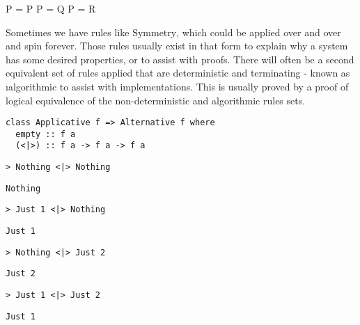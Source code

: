 \begin{frame}[c]
  \begin{mdframed}[frametitle={Equivalence relations}]

  \infrule[Reflexivity]
          {}
          {P = P}
          {P = Q}
          {P = R}
  \end{mdframed}

  \medskip

  \begin{overprint}
  \onslide<+>
  Sometimes we have rules like $\text{Symmetry}$, which could be applied over and over and spin forever.
  \onslide<+>
  Those rules usually exist in that form to explain why a system has some desired properties, or to assist with proofs.
  \onslide<+>
  There will often be a second equivalent set of rules applied that are deterministic and terminating - known as {\i algorithmic} to assist with implementations.
  \onslide<+>
  This is usually proved by a proof of logical equivalence of the non-deterministic and algorithmic rules sets.
  \end{overprint}
\end{frame}

\begin{frame}[fragile]
  \begin{verbatim}
class Applicative f => Alternative f where
  empty :: f a
  (<|>) :: f a -> f a -> f a
  \end{verbatim}
\end{frame}

\begin{frame}[fragile]
  \onslide<+->
  \begin{verbatim}
> Nothing <|> Nothing
  \end{verbatim}
  \onslide<+->
  \begin{verbatim}
Nothing
  \end{verbatim}
  \onslide<+->
  \begin{verbatim}
> Just 1 <|> Nothing
  \end{verbatim}
  \onslide<+->
  \begin{verbatim}
Just 1
  \end{verbatim}
  \onslide<+->
  \begin{verbatim}
> Nothing <|> Just 2
  \end{verbatim}
  \onslide<+->
  \begin{verbatim}
Just 2
  \end{verbatim}
  \onslide<+->
  \begin{verbatim}
> Just 1 <|> Just 2
  \end{verbatim}
  \onslide<+->
  \begin{verbatim}
Just 1
  \end{verbatim}
\end{frame}

